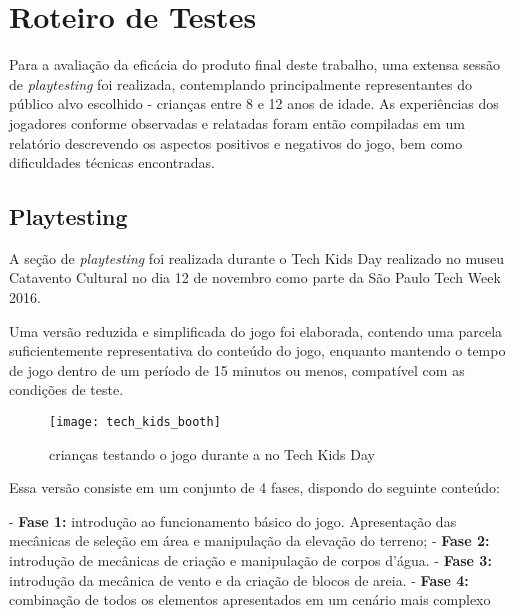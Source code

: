 
\chapter{Roteiro de Testes}\label{cap-metodologia}

Para a avaliação da eficácia do produto final deste trabalho, uma extensa sessão de \textit{playtesting} foi realizada, contemplando principalmente representantes do público alvo escolhido - crianças entre 8 e 12 anos de idade. As experiências dos jogadores conforme observadas e relatadas foram então compiladas em um relatório descrevendo os aspectos positivos e negativos do jogo, bem como dificuldades técnicas encontradas.

\section{Playtesting}\label{sec-planejamento}

A seção de \textit{playtesting} foi realizada durante o Tech Kids Day realizado no museu Catavento Cultural no dia 12 de novembro como parte da São Paulo Tech Week 2016. 

Uma versão reduzida e simplificada do jogo foi elaborada, contendo uma parcela suficientemente representativa do conteúdo do jogo, enquanto mantendo o tempo de jogo dentro de um período de 15 minutos ou menos, compatível com as condições de teste.

\begin{figure}[h]
	\centering
	\texttt{[image: tech\_kids\_booth]}
	\caption{crianças testando o jogo durante a no Tech Kids Day}
\end{figure}

Essa versão consiste em um conjunto de 4 fases, dispondo do seguinte conteúdo:

- \textbf{Fase 1:} introdução ao funcionamento básico do jogo. Apresentação das mecânicas de seleção em área e manipulação da elevação do terreno;
- \textbf{Fase 2:} introdução de mecânicas de criação e manipulação de corpos d'água.
- \textbf{Fase 3:} introdução da mecânica de vento e da criação de blocos de areia.
- \textbf{Fase 4:} combinação de todos os elementos apresentados em um cenário mais complexo

